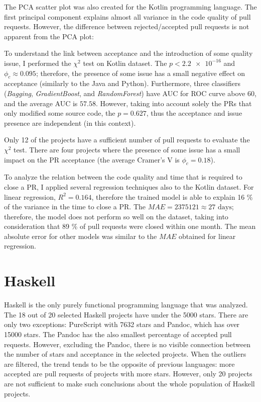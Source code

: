 \documentclass[digital,oneside,oldtable,nolof,nolot,nocover]{fithesis4}
\begin{document}
The PCA scatter plot was also created for the Kotlin programming language.
The first principal component explains almost all variance in the code quality of pull requests.
However, the difference between rejected/accepted pull requests is not apparent from the PCA plot:

To understand the link between acceptance and the introduction of some
quality issue, I performed the \(\chi^2\) test on Kotlin dataset. The \(p < \num{2.2e-16}\) and
\(\phi_c \approx 0.095\); therefore, the presence of some issue has a small
negative effect on acceptance (similarly to the Java and Python).
Furthermore, three classifiers (\emph{Bagging}, \emph{GradientBoost}, and \emph{RandomForest})
have AUC for ROC curve above 60, and the average AUC is \(57.58\).
However, taking into account solely the PRs that only modified some source
code, the \(p = 0.627\), thus the acceptance and issue presence are independent
(in this context).

Only 12 of the projects have a sufficient number of pull requests to evaluate
the \(\chi^2\) test. There are four projects where the presence of some issue
has a small impact on the PR acceptance (the average Cramer's V is \(\phi_c = 0.18\)).

To analyze the relation between the code quality and time that is required to
close a PR, I applied several regression techniques also to the Kotlin
dataset.  For linear regression, \(R^2 = 0.164\), therefore the trained model is
able to explain 16 \% of the variance in the time to close a PR. The \(MAE =
   2375121 \approx 27\text{ days}\); therefore, the model does not perform so well
on the dataset, taking into consideration that 89 \% of pull requests were
closed within one month. The mean absolute error for other models was similar
to the \(MAE\) obtained for linear regression.
\section{Haskell}
\label{sec:orgc1739db}
Haskell is the only purely functional programming language that was analyzed.
The 18 out of 20 selected Haskell projects have under the 5000 stars. There
are only two exceptions: PureScript with 7632 stars and Pandoc, which has over
15000 stars. The Pandoc has the also smallest percentage of accepted pull
requests.  However, excluding the Pandoc, there is no visible connection
between the number of stars and acceptance in the selected projects. When the
outliers are filtered, the trend tends to be the opposite of previous languages:
more accepted are pull requests of projects with more stars.  However, only
20 projects are not sufficient to make such conclusions about the whole
population of Haskell projects.
\end{document}
